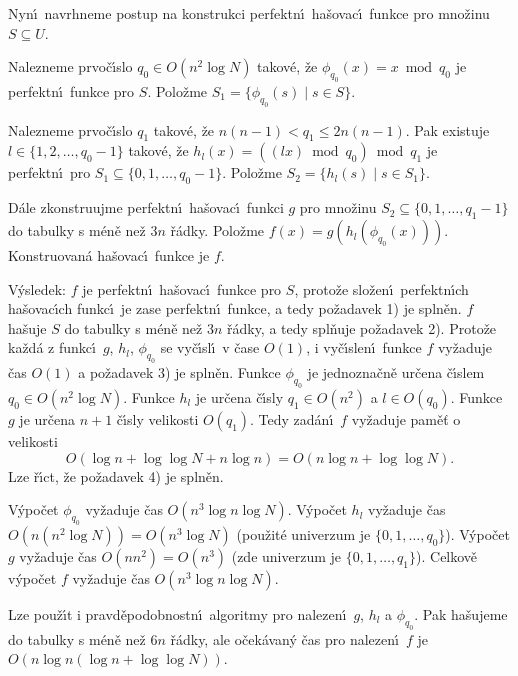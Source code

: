 \documentclass[a4paper,12pt]{article}
\begin{document}
\flushpar Nyn\'\i\ navrhneme postup na konstrukci perfektn\'\i\ 
ha\v sovac\'\i\ funk\-ce pro mno\v zinu $S\subseteq U$.

\roster
\item
Nalezneme prvo\v c\'\i slo $q_0\in O(n^2\log N)$ takov\'e, \v ze 
$\phi_{q_0}(x)=x\bmod q_0$ je perfektn\'\i\ funkce pro $S$. Polo\v zme 
$S_1=\{\phi_{q_0}(s)\mid s\in S\}$.
\item
Nalezneme prvo\v c\'\i slo $q_1$ takov\'e, \v ze 
$n(n-1)<q_1\le 2n(n-1)$. Pak existuje 
$l\in \{1,2,\dots,q_0-1\}$ takov\'e, \v ze $h_l(x)=((lx)\bmod q_0
)\bmod q_1$ 
je perfektn\'\i\ pro $S_1\subseteq \{0,1,\dots,q_0-1\}$. Polo\v zme 
$S_2=\{h_l(s)\mid s\in S_1\}$.
\item
D\'ale zkonstruujme perfektn\'\i\ ha\v sovac\'\i\ funkci 
$g$ pro mno\v zinu 
$S_2\subseteq \{0,1,\dots,q_1-1\}$ do tabulky s m\'en\v e ne\v z $
3n$ \v r\'adky. 
Polo\v zme $f(x)=g(h_l(\phi_{q_0}(x)))$. Konstruovan\'a ha\v sovac\'\i\ 
funkce je $f$.
\endroster

\flushpar V\'ysledek: $f$ je perfektn\'\i\ ha\v sovac\'\i\ funkce pro $
S$, proto\v ze 
slo\v zen\'\i\ perfektn\'\i ch ha\v sovac\'\i ch funkc\'\i\ je zase perfektn\'\i\ 
funkce, a tedy po\v zadavek 1) je spln\v en. \newline 
$f$ ha\v suje $S$ do tabulky s m\'en\v e ne\v z $3n$ \v r\'adky, a tedy 
spl\v nuje po\v zadavek 2). \newline 
Proto\v ze ka\v zd\'a z funkc\'\i\ $g$, $h_l$, $\phi_{q_0}$ se vy\v c\'\i sl\'\i\ v \v case $
O(1)$, 
i vy\v c\'\i slen\'\i\ funkce $f$ vy\v zaduje \v cas $O(1)$ a po\v zadavek 3) je 
spln\v en.\newline 
Funkce $\phi_{q_0}$ je jednozna\v cn\v e ur\v cena \v c\'\i slem $
q_0\in O(n^2\log N)$. 
Funkce $h_l$ je ur\v cena \v c\'\i sly $q_1\in O(n^2)$ a $l\in O(
q_0)$. Funkce $g$ 
je ur\v cena $n+1$ \v c\'\i sly velikosti $O(q_1)$. Tedy zad\'an\'\i\ $
f$ 
vy\v zaduje pam\v e\v t o velikosti 
$$O(\log n+\log\log N+n\log n)=O(n\log n+\log\log N).$$
Lze \v r\'\i ct, \v ze po\v zadavek 4) je spln\v en. 
\medskip

\flushpar V\'ypo\v cet $\phi_{q_0}$ vy\v zaduje \v cas $O(n^3\log 
n\log N)$. V\'ypo\v cet $h_l$ 
vy\v za\-du\-je \v cas $O(n(n^2\log N))=O(n^3\log N)$ (pou\v zit\'e univerzum je 
$\{0,1,\dots,q_0\}$). V\'ypo\v cet $g$ vy\v zaduje \v cas $O(nn^2
)=O(n^3)$ 
(zde univerzum je $\{0,1,\dots,q_1\}$). Celkov\v e 
v\'ypo\v cet $f$ vy\v zaduje \v cas $O(n^3\log n\log N)$.
\medskip

\flushpar Lze pou\v z\'\i t i pravd\v epodobnostn\'\i\ algoritmy pro nalezen\'\i\ 
$g$, $h_l$ a $\phi_{q_0}$. Pak ha\v sujeme do tabulky s m\'en\v e ne\v z $
6n$ 
\v r\'adky, ale o\v cek\'avan\'y \v cas pro nalezen\'\i\ $f$ je 
$O(n\log n(\log n+\log\log N))$.
\bigskip
\end{document}
